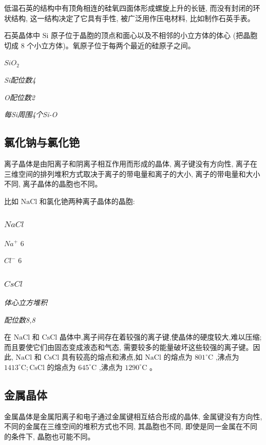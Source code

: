 \documentclass[10pt,cn]{elegantbook}
\begin{document}
 低温石英的结构中有顶角相连的硅氧四面体形成螺旋上升的长链, 而没有封闭的环状结构, 这一结构决定了它具有手性, 被广泛用作压电材料, 比如制作石英手表。
 
 石英晶体中 \(\mathrm{{Si}}\) 原子位于晶胞的顶点和面心以及不相邻的小立方体的体心 (把晶胞切成 8 个小立方体)。氧原子位于每两个最近的硅原子之间。
 
 
 $SiO_{2}$
 
 
\textit{ Si配位数4}
 
\textit{ O配位数2}
 
\textit{ 每Si周围4个Si-O}
 

   \subsection{ 氯化钠与氯化铯}
   
 离子晶体是由阳离子和阴离子相互作用而形成的晶体, 离子键没有方向性, 离子在三维空间的排列堆积方式取决于离子的带电量和离子的大小, 离子的带电量和大小不同, 离子晶体的晶胞也不同。
 
 比如 \(\mathrm{{NaCl}}\) 和氯化铯两种离子晶体的晶胞:

\subsubsection{  $NaCl$}
  
  $Na^{+}$ 6

  $Cl^{-}$ 6
  
\subsubsection{$CsCl$}
  
 \textit{ 体心立方堆积}
  
  \textit{配位数8,8}
  
  在 \(\mathrm{{NaCl}}\) 和 \(\mathrm{{CsCl}}\) 晶体中,离子间存在着较强的离子键,使晶体的硬度较大,难以压缩; 而且要使它们由固态变成液态和气态, 需要较多的能量破坏这些较强的离子键。因此, \(\mathrm{{NaCl}}\) 和 \(\mathrm{{CsCl}}\) 具有较高的熔点和沸点,如 \(\mathrm{{NaCl}}\) 的熔点为 \({801}^{ \circ }\mathrm{C}\) ,沸点为 \({1413}^{ \circ }\mathrm{C};\mathrm{{CsCl}}\) 的熔点为 \({645}^{ \circ }\mathrm{C}\) ,沸点为 \({1290}^{ \circ }\mathrm{C}\) 。


\subsection{ 金属晶体}

金属晶体是金属阳离子和电子通过金属键相互结合形成的晶体, 金属键没有方向性, 不同的金属在三维空间的堆积方式也不同, 其晶胞也不同, 即使是同一金属在不同的条件下, 晶胞也可能不同。
\end{document}

